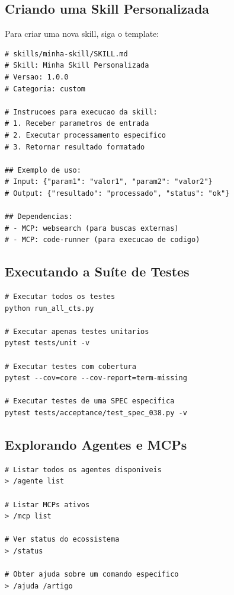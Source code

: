 \subsection{Criando uma Skill Personalizada}
\label{subsec:lab-skill}

Para criar uma nova skill, siga o template:

\begin{lstlisting}[style=pythonstyle, caption={Template de skill personalizada},
                   label={lst:lab-skill}]
# skills/minha-skill/SKILL.md
# Skill: Minha Skill Personalizada
# Versao: 1.0.0
# Categoria: custom

# Instrucoes para execucao da skill:
# 1. Receber parametros de entrada
# 2. Executar processamento especifico
# 3. Retornar resultado formatado

## Exemplo de uso:
# Input: {"param1": "valor1", "param2": "valor2"}
# Output: {"resultado": "processado", "status": "ok"}

## Dependencias:
# - MCP: websearch (para buscas externas)
# - MCP: code-runner (para execucao de codigo)
\end{lstlisting}

\subsection{Executando a Suíte de Testes}
\label{subsec:lab-testes}

\begin{lstlisting}[style=bashstyle, caption={Execucao da suite de testes},
                   label={lst:lab-testes}]
# Executar todos os testes
python run_all_cts.py

# Executar apenas testes unitarios
pytest tests/unit -v

# Executar testes com cobertura
pytest --cov=core --cov-report=term-missing

# Executar testes de uma SPEC especifica
pytest tests/acceptance/test_spec_038.py -v
\end{lstlisting}

\subsection{Explorando Agentes e MCPs}
\label{subsec:lab-explorar}

\begin{lstlisting}[style=bashstyle, caption={Exploracao de agentes e MCPs},
                   label={lst:lab-explorar}]
# Listar todos os agentes disponiveis
> /agente list

# Listar MCPs ativos
> /mcp list

# Ver status do ecossistema
> /status

# Obter ajuda sobre um comando especifico
> /ajuda /artigo
\end{lstlisting}

